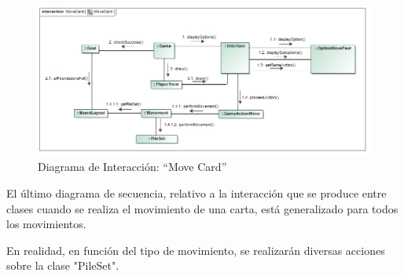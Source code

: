 \documentclass[11pt]{article}
\begin{document}
\begin{center}
 \begin{figure}[H]
 \begin{center}
   \includegraphics[width=17cm]{Analysis/MoveCardGenericSequence00.jpg}
   \caption{Diagrama de Interacción: ``Move Card''}
   \label{fig:movecardsequence}
 \end{center}
 \end{figure}
\end{center}

El último diagrama de secuencia, relativo a la interacción que se produce entre clases cuando se realiza el movimiento de una carta, está generalizado para todos los movimientos.

En realidad, en función del tipo de movimiento, se realizarán diversas acciones sobre la clase "PileSet". 
\end{document}
